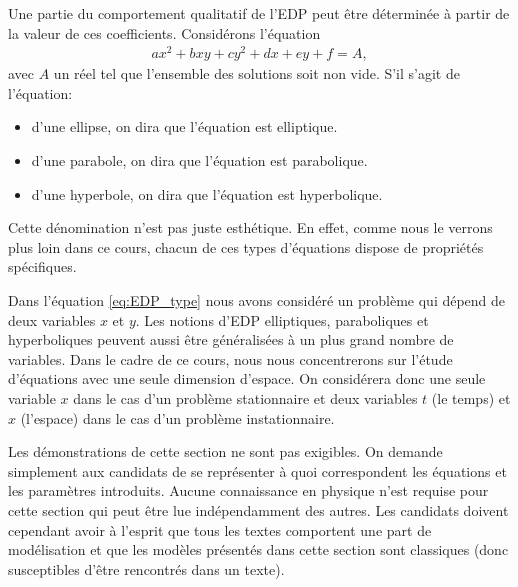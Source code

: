 \documentclass[12pt,a4paper,twoside]{article}
\begin{document}
Une partie du comportement qualitatif de l'EDP peut \^etre d\'etermin\'ee
\`a partir de la valeur de ces coefficients.
Consid\'erons l'\'equation
\begin{align}
  \label{eq:EDP_geom}
  a x^2 + b xy + c y^2 + d x + e y + f = A ,
\end{align}
avec $A$ un r\'eel tel que l'ensemble des solutions soit non vide.
S'il s'agit de l'\'equation:
\begin{itemize}
\item d'une ellipse, on dira que l'\'equation est elliptique.
\item d'une parabole, on dira que l'\'equation est parabolique.
\item d'une hyperbole, on dira que l'\'equation est hyperbolique.
\end{itemize}
Cette d\'enomination n'est pas juste esth\'etique.
En effet, comme nous le verrons plus loin dans ce cours,
chacun de ces types d'\'equations dispose de propri\'et\'es sp\'ecifiques.

Dans l'\'equation \eqref{eq:EDP_type}
nous avons consid\'er\'e un probl\`eme qui d\'epend de deux
variables $x$ et $y$. 
Les notions d'EDP elliptiques, paraboliques et hyperboliques peuvent
aussi \^etre g\'en\'eralis\'ees \`a un plus grand nombre de variables.
Dans le cadre de ce cours, nous nous concentrerons 
sur l'\'etude d'\'equations
avec une seule dimension d'espace.
On consid\'erera donc une seule variable $x$ dans le cas d'un probl\`eme stationnaire
et deux variables $t$ (le temps) et $x$ (l'espace) dans le cas d'un probl\`eme
instationnaire.




\begin{remark}
  Les d\'emonstrations de cette section ne sont pas exigibles.
  On demande simplement aux candidats de se repr\'esenter \`a quoi
  correspondent les \'equations et les param\`etres introduits.
  Aucune connaissance en physique n'est requise pour cette section
  qui peut \^etre lue ind\'ependamment des autres.
  Les candidats doivent cependant avoir \`a l'esprit que tous les textes
  comportent une part de mod\'elisation et que les mod\`eles pr\'esent\'es dans cette
  section sont classiques (donc susceptibles d'\^etre rencontr\'es dans un texte).
\end{remark}



\end{document}
